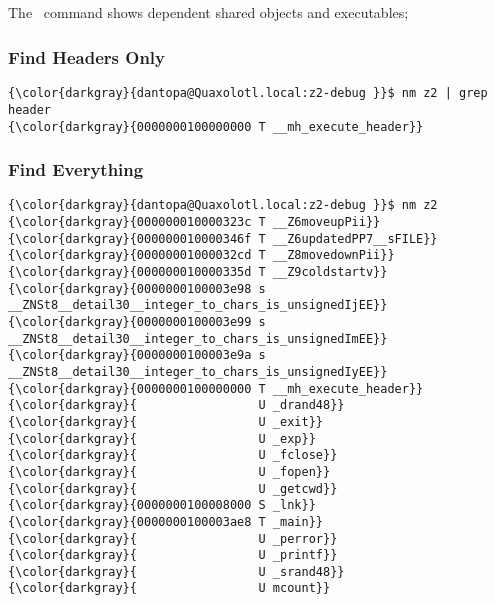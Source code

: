 % 

\subsection{\nm}
\label{sec:nm}

The  \ command shows dependent shared objects and executables; 

		\subsubsection{Find Headers Only}
{\footnotesize{
\begin{Verbatim}[commandchars=\\\{\}]
{\color{darkgray}{dantopa@Quaxolotl.local:z2-debug }}$ nm z2 | grep header
{\color{darkgray}{0000000100000000 T __mh_execute_header}}
\end{Verbatim}
}}

		\subsubsection{Find Everything}
{\footnotesize{
\begin{Verbatim}[commandchars=\\\{\}]
{\color{darkgray}{dantopa@Quaxolotl.local:z2-debug }}$ nm z2
{\color{darkgray}{000000010000323c T __Z6moveupPii}}
{\color{darkgray}{000000010000346f T __Z6updatedPP7__sFILE}}
{\color{darkgray}{00000001000032cd T __Z8movedownPii}}
{\color{darkgray}{000000010000335d T __Z9coldstartv}}
{\color{darkgray}{0000000100003e98 s __ZNSt8__detail30__integer_to_chars_is_unsignedIjEE}}
{\color{darkgray}{0000000100003e99 s __ZNSt8__detail30__integer_to_chars_is_unsignedImEE}}
{\color{darkgray}{0000000100003e9a s __ZNSt8__detail30__integer_to_chars_is_unsignedIyEE}}
{\color{darkgray}{0000000100000000 T __mh_execute_header}}
{\color{darkgray}{                 U _drand48}}
{\color{darkgray}{                 U _exit}}
{\color{darkgray}{                 U _exp}}
{\color{darkgray}{                 U _fclose}}
{\color{darkgray}{                 U _fopen}}
{\color{darkgray}{                 U _getcwd}}
{\color{darkgray}{0000000100008000 S _lnk}}
{\color{darkgray}{0000000100003ae8 T _main}}
{\color{darkgray}{                 U _perror}}
{\color{darkgray}{                 U _printf}}
{\color{darkgray}{                 U _srand48}}
{\color{darkgray}{                 U mcount}}
\end{Verbatim}
}}


\endinput  %

